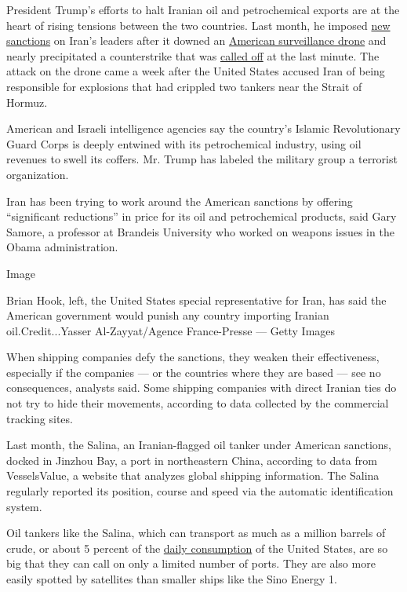 President Trump's efforts to halt Iranian oil and petrochemical exports
are at the heart of rising tensions between the two countries. Last
month, he imposed
\href{https://www.nytimes3xbfgragh.onion/2019/06/24/us/politics/iran-sanctions.html}{new
sanctions} on Iran's leaders after it downed an
\href{https://www.nytimes3xbfgragh.onion/interactive/2019/06/21/world/middleeast/map-us-iran-drone-attack.html}{American
surveillance drone} and nearly precipitated a counterstrike that was
\href{https://www.nytimes3xbfgragh.onion/2019/06/20/world/middleeast/iran-us-drone.html}{called
off} at the last minute. The attack on the drone came a week after the
United States accused Iran of being responsible for explosions that had
crippled two tankers near the Strait of Hormuz.

American and Israeli intelligence agencies say the country's Islamic
Revolutionary Guard Corps is deeply entwined with its petrochemical
industry, using oil revenues to swell its coffers. Mr. Trump has labeled
the military group a terrorist organization.

Iran has been trying to work around the American sanctions by offering
``significant reductions'' in price for its oil and petrochemical
products, said Gary Samore, a professor at Brandeis University who
worked on weapons issues in the Obama administration.

Image

Brian Hook, left, the United States special representative for Iran, has
said the American government would punish any country importing Iranian
oil.Credit...Yasser Al-Zayyat/Agence France-Presse --- Getty Images

When shipping companies defy the sanctions, they weaken their
effectiveness, especially if the companies --- or the countries where
they are based --- see no consequences, analysts said. Some shipping
companies with direct Iranian ties do not try to hide their movements,
according to data collected by the commercial tracking sites.

Last month, the Salina, an Iranian-flagged oil tanker under American
sanctions, docked in Jinzhou Bay, a port in northeastern China,
according to data from VesselsValue, a website that analyzes global
shipping information. The Salina regularly reported its position, course
and speed via the automatic identification system.

Oil tankers like the Salina, which can transport as much as a million
barrels of crude, or about 5 percent of the
\href{https://www.eia.gov/tools/faqs/faq.php?id=33\&t=6}{daily
consumption} of the United States, are so big that they can call on only
a limited number of ports. They are also more easily spotted by
satellites than smaller ships like the Sino Energy 1.

